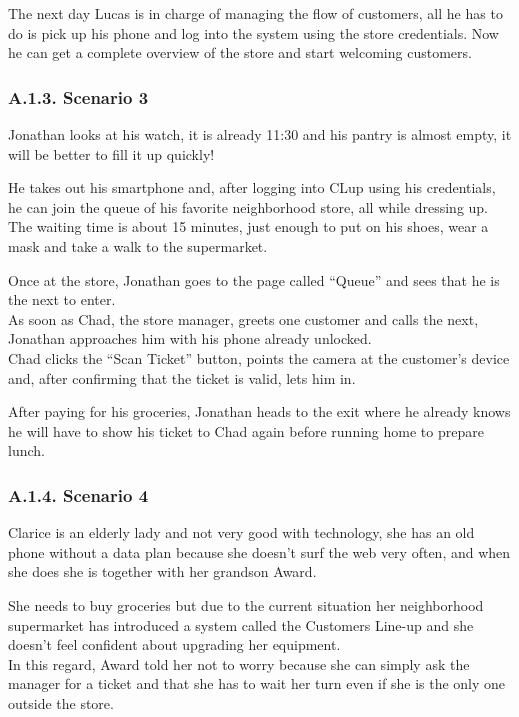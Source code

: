 The next day Lucas is in charge of managing the flow of customers, all he has to do is pick up his phone and log into the system using the store credentials. Now he can get a complete overview of the store and start welcoming customers.

\subsubsection{A.1.3. Scenario 3}

Jonathan looks at his watch, it is already 11:30 and his pantry is almost empty, it will be better to fill it up quickly!

He takes out his smartphone and, after logging into CLup using his credentials, he can join the queue of his favorite neighborhood store, all while dressing up.\\
The waiting time is about 15 minutes, just enough to put on his shoes, wear a mask and take a walk to the supermarket.

Once at the store, Jonathan goes to the page called ``Queue'' and sees that he is the next to enter.\\
As soon as Chad, the store manager, greets one customer and calls the next, Jonathan approaches him with his phone already unlocked.\\
Chad clicks the ``Scan Ticket'' button, points the camera at the customer's device and, after confirming that the ticket is valid, lets him in.

After paying for his groceries, Jonathan heads to the exit where he already knows he will have to show his ticket to Chad again before running home to prepare lunch.

\subsubsection{A.1.4. Scenario 4}

Clarice is an elderly lady and not very good with technology, she has an old phone without a data plan because she doesn't surf the web very often, and when she does she is together with her grandson Award.

She needs to buy groceries but due to the current situation her neighborhood supermarket has introduced a system called the Customers Line-up and she doesn't feel confident about upgrading her equipment.\\
In this regard, Award told her not to worry because she can simply ask the manager for a ticket and that she has to wait her turn even if she is the only one outside the store.

